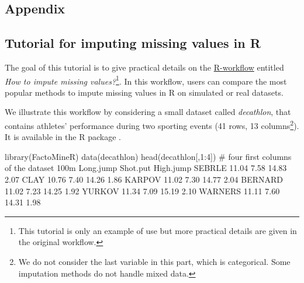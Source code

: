 \begin{appendix}


\section{Appendix}




\subsection{Tutorial for imputing missing values in {R}} \label{app:tutoR}

The goal of this tutorial is to give practical details on the \href{https://rmisstastic.netlify.app/how-to/impute/missimp}{{R}-workflow} entitled \textit{How to impute missing values?}\footnote{This tutorial is only an example of use but more practical details are given in the original workflow.}. In this workflow, users can compare the most popular methods to impute missing values in {R} on simulated or real datasets. 

We illustrate this workflow by considering a small dataset called \textit{decathlon}, that contains athletes' performance during two sporting events (41 rows, 13 columns\footnote{We do not consider the last variable in this part, which is categorical. Some imputation methods do not handle mixed data.}). It is available in the {R} package  \citep{le2008factominer}.


\begin{example}
library(FactoMineR)
data(decathlon)
head(decathlon[,1:4]) # four first columns of the  dataset
         100m Long.jump Shot.put High.jump
SEBRLE  11.04      7.58    14.83      2.07
CLAY    10.76      7.40    14.26      1.86
KARPOV  11.02      7.30    14.77      2.04
BERNARD 11.02      7.23    14.25      1.92
YURKOV  11.34      7.09    15.19      2.10
WARNERS 11.11      7.60    14.31      1.98
\end{example}


\end{appendix}
